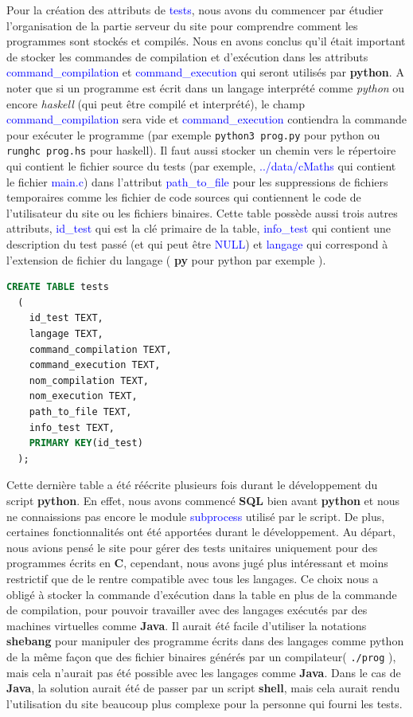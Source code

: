 \documentclass[a4paper]{article}
\renewcommand{\texttt}[2][blue]{\textcolor{#1}{\ttfamily #2}}
\begin{document}
  Pour la création des attributs de \texttt{tests}, nous avons du commencer par
  étudier l'organisation de la partie serveur du site pour comprendre comment
  les programmes sont stockés et compilés. Nous en avons conclus qu'il était
  important de stocker les commandes de compilation et d'exécution dans les
  attributs \texttt{command\_compilation} et \texttt{command\_execution} qui
  seront utilisés par \textbf{python}. A noter que si un programme est écrit
  dans un langage interprété comme \textit{python} ou encore \textit{haskell}
  (qui peut être compilé et interprété), le champ \texttt{command\_compilation}
  sera vide et \texttt{command\_execution} contiendra la commande pour exécuter
  le programme (par exemple \lstinline{python3 prog.py} pour python ou
  \lstinline{runghc prog.hs} pour haskell). Il faut aussi stocker un chemin
  vers le répertoire qui contient le fichier source du tests (par exemple,
  \texttt{../data/cMaths} qui contient le fichier \texttt{main.c}) dans
  l'attribut \texttt{path\_to\_file} pour les suppressions de fichiers
  temporaires comme les fichier de code sources qui contiennent le code de
  l'utilisateur du site ou les fichiers binaires. Cette table possède aussi
  trois autres attributs, \texttt{id\_test} qui est la clé primaire de la table,
  \texttt{info\_test} qui contient une description du test passé (et qui peut
  être \texttt{NULL}) et \texttt{langage} qui correspond à l'extension de
  fichier du langage ( \textbf{py} pour python par exemple  ).

  \begin{lstlisting}[language=SQL]
  CREATE TABLE tests
  (
    id_test TEXT,
    langage TEXT,
    command_compilation TEXT,
    command_execution TEXT,
    nom_compilation TEXT,
    nom_execution TEXT,
    path_to_file TEXT,
    info_test TEXT,
    PRIMARY KEY(id_test)
  );
  \end{lstlisting}

  Cette dernière table a été réécrite plusieurs fois durant le développement du
  script \textbf{python}. En effet, nous avons commencé \textbf{SQL} bien avant
  \textbf{python} et nous ne connaissions pas encore le module
  \texttt{subprocess} utilisé par le script. De plus, certaines fonctionnalités
  ont été apportées durant le développement. Au départ, nous avions pensé le
  site pour gérer des tests unitaires uniquement pour des programmes écrits en
  \textbf{C}, cependant, nous avons jugé plus intéressant et moins restrictif
  que de le rentre compatible avec tous les langages. Ce choix nous a obligé à
  stocker la commande d'exécution dans la table en plus de la commande de
  compilation, pour pouvoir travailler avec des langages exécutés par des
  machines virtuelles comme \textbf{Java}. Il aurait été facile d'utiliser la
  notations \textbf{shebang} pour manipuler des programme écrits dans des
  langages comme python de la même façon que des fichier binaires générés par
  un compilateur( \lstinline{./prog} ), mais cela n'aurait pas été possible
  avec les langages comme \textbf{Java}. Dans le cas de \textbf{Java}, la
  solution aurait été de passer par un script \textbf{shell}, mais cela aurait
  rendu l'utilisation du site beaucoup plus complexe pour la personne qui
  fourni les tests.
\end{document}

